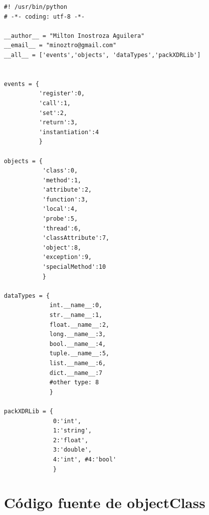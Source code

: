\documentclass[12pt,legalpaper]{report}
\begin{document}
\begin{singlespace}
\begin{lstlisting}[style=Python]
#! /usr/bin/python
# -*- coding: utf-8 -*-

__author__ = "Milton Inostroza Aguilera"
__email__ = "minoztro@gmail.com"
__all__ = ['events','objects', 'dataTypes','packXDRLib']


events = {
          'register':0,
          'call':1,
          'set':2,
          'return':3,
          'instantiation':4
          }

objects = {
           'class':0,
           'method':1,
           'attribute':2,
           'function':3,
           'local':4,
           'probe':5,
           'thread':6,
           'classAttribute':7,
           'object':8,
           'exception':9,
           'specialMethod':10
           }

dataTypes = {
             int.__name__:0,
             str.__name__:1,
             float.__name__:2,
             long.__name__:3,
             bool.__name__:4,
             tuple.__name__:5,
             list.__name__:6,
             dict.__name__:7
             #other type: 8
             }

packXDRLib = {
              0:'int',
              1:'string',
              2:'float',
              3:'double',
              4:'int', #4:'bool'
              }
\end{lstlisting}
\end{singlespace}

	\section{Código fuente de objectClass}
	
\end{document}
